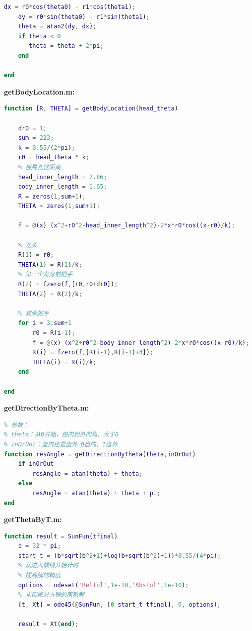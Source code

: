 \documentclass[withoutpreface,bwprint]{cumcmthesis} %
\begin{document}
\begin{appendices}
\begin{lstlisting}[language=matlab]
    dx = r0*cos(theta0) - r1*cos(theta1);
    dy = r0*sin(theta0) - r1*sin(theta1);
    theta = atan2(dy, dx);
    if theta < 0
       theta = theta + 2*pi; 
    end

end
\end{lstlisting}
\noindent\textbf{\textcolor[rgb]{0.98,0.00,0.00}{getBodyLocation.m:}}
\begin{lstlisting}[language=matlab]
% 输入龙头相角，输出整条龙包括龙头、龙身、龙尾的位置（极坐标）
function [R, THETA] = getBodyLocation(head_theta)

    dr0 = 1;
    sum = 223;
    k = 0.55/(2*pi);
    r0 = head_theta * k;
    % 板凳孔径距离
    head_inner_length = 2.86;
    body_inner_length = 1.65;
    R = zeros(1,sum+1);
    THETA = zeros(1,sum+1);
    
    f = @(x) (x^2+r0^2-head_inner_length^2)-2*x*r0*cos((x-r0)/k);
    
    % 龙头
    R(1) = r0;
    THETA(1) = R(1)/k;
    % 第一个龙身前把手
    R(2) = fzero(f,[r0,r0+dr0]);
    THETA(2) = R(2)/k;
    
    % 其余把手
    for i = 3:sum+1
        r0 = R(i-1);
        f = @(x) (x^2+r0^2-body_inner_length^2)-2*x*r0*cos((x-r0)/k);
        R(i) = fzero(f,[R(i-1),R(i-1)+3]);
        THETA(i) = R(i)/k;
    end

end
\end{lstlisting}
\noindent\textbf{\textcolor[rgb]{0.98,0.00,0.00}{getDirectionByTheta.m:}}
\begin{lstlisting}[language=matlab]
% 通过theta角计算当前速度方向与x轴正方向的夹角
% 参数：
% theta：从0开始，由内到外的角，大于0
% inOrOut：盘内还是盘外 0盘内，1盘外
function resAngle = getDirectionByTheta(theta,inOrOut)
    if inOrOut
        resAngle = atan(theta) + theta;
    else
        resAngle = atan(theta) + theta + pi;
end
\end{lstlisting}
\noindent\textbf{\textcolor[rgb]{0.98,0.00,0.00}{getThetaByT.m:}}
\begin{lstlisting}[language=matlab]
function result = SunFun(tfinal)
    b = 32 * pi;
    start_t = (b*sqrt(b^2+1)+log(b+sqrt(b^2)+1))*0.55/(4*pi);
    % 从进入螺线开始计时
    % 提高解的精度
    options = odeset('RelTol',1e-10,'AbsTol',1e-10);
    % 求偏微分方程的离散解
    [t, Xt] = ode45(@SunFun, [0 start_t-tfinal], 0, options);   
    
    result = Xt(end);


\end{lstlisting}
\end{appendices}
\end{document}
